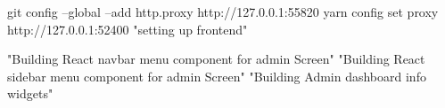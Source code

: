 git config --global --add http.proxy http://127.0.0.1:55820
yarn config set proxy http://127.0.0.1:52400
"setting up frontend"

"Building React navbar menu component for admin Screen"
"Building React sidebar menu component for admin Screen"
"Building Admin dashboard info widgets"
